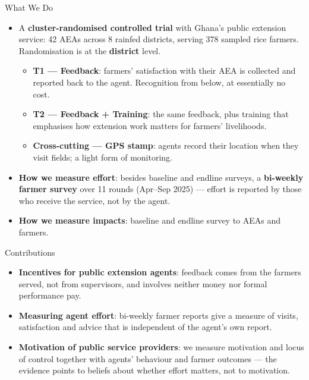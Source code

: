\documentclass[aspectratio=169]{beamer}
\begin{document}
\begin{frame}{What We Do}
	\begin{itemize}\small
		\item A \textbf{cluster-randomised controlled trial} with Ghana's public extension
		service: 42 AEAs across 8 rainfed districts, serving 378 sampled rice farmers.
		Randomisation is at the \textbf{district} level.
        \begin{itemize}
            \item \textbf{T1 --- Feedback}: farmers' satisfaction with their AEA is collected and
		reported back to the agent. Recognition from below, at essentially no cost.
            \item \textbf{T2 --- Feedback + Training}: the same feedback, plus training that emphasises how extension work matters for farmers' livelihoods.
            \item \textbf{Cross-cutting --- GPS stamp}: agents record their location when they visit
		fields; a light form of monitoring.
        \end{itemize}

		\vspace{0.18cm}
		\item \textbf{How we measure effort}: besides baseline and endline surveys, a
		\textbf{bi-weekly farmer survey} over 11 rounds (Apr--Sep 2025) --- effort is reported by
		those who receive the service, not by the agent.

        \vspace{0.18cm}
		\item \textbf{How we measure impacts}: baseline and endline survey to AEAs and farmers.

	\end{itemize}
\end{frame}


\begin{frame}{Contributions}
	\begin{itemize}
		\item \textbf{Incentives for public extension agents}: feedback comes from the farmers
		served, not from supervisors, and involves neither money nor formal performance pay.
		\vspace{0.3cm}
		\item \textbf{Measuring agent effort}: bi-weekly farmer reports give a measure of
		visits, satisfaction and advice that is independent of the agent's own report.
		\vspace{0.3cm}
		\item \textbf{Motivation of public service providers}: we measure motivation and locus
		of control together with agents' behaviour and farmer outcomes --- the evidence points
		to beliefs about whether effort matters, not to motivation.
	\end{itemize}
\end{frame}
\end{document}
